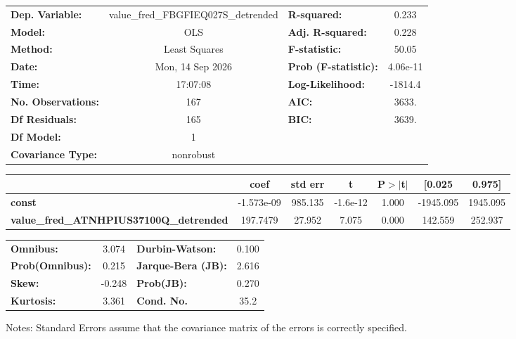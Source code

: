 \begin{center}
\begin{tabular}{lclc}
\toprule
\textbf{Dep. Variable:}                         & value\_fred\_FBGFIEQ027S\_detrended & \textbf{  R-squared:         } &     0.233   \\
\textbf{Model:}                                 &                 OLS                 & \textbf{  Adj. R-squared:    } &     0.228   \\
\textbf{Method:}                                &            Least Squares            & \textbf{  F-statistic:       } &     50.05   \\
\textbf{Date:}                                  &           Mon, 14 Sep 2026          & \textbf{  Prob (F-statistic):} &  4.06e-11   \\
\textbf{Time:}                                  &               17:07:08              & \textbf{  Log-Likelihood:    } &   -1814.4   \\
\textbf{No. Observations:}                      &                   167               & \textbf{  AIC:               } &     3633.   \\
\textbf{Df Residuals:}                          &                   165               & \textbf{  BIC:               } &     3639.   \\
\textbf{Df Model:}                              &                     1               & \textbf{                     } &             \\
\textbf{Covariance Type:}                       &              nonrobust              & \textbf{                     } &             \\
\bottomrule
\end{tabular}
\begin{tabular}{lcccccc}
                                                & \textbf{coef} & \textbf{std err} & \textbf{t} & \textbf{P$> |$t$|$} & \textbf{[0.025} & \textbf{0.975]}  \\
\midrule
\textbf{const}                                  &   -1.573e-09  &      985.135     &  -1.6e-12  &         1.000        &    -1945.095    &     1945.095     \\
\textbf{value\_fred\_ATNHPIUS37100Q\_detrended} &     197.7479  &       27.952     &     7.075  &         0.000        &      142.559    &      252.937     \\
\bottomrule
\end{tabular}
\begin{tabular}{lclc}
\textbf{Omnibus:}       &  3.074 & \textbf{  Durbin-Watson:     } &    0.100  \\
\textbf{Prob(Omnibus):} &  0.215 & \textbf{  Jarque-Bera (JB):  } &    2.616  \\
\textbf{Skew:}          & -0.248 & \textbf{  Prob(JB):          } &    0.270  \\
\textbf{Kurtosis:}      &  3.361 & \textbf{  Cond. No.          } &     35.2  \\
\bottomrule
\end{tabular}
\end{center}

Notes: \newline
 [1] Standard Errors assume that the covariance matrix of the errors is correctly specified.